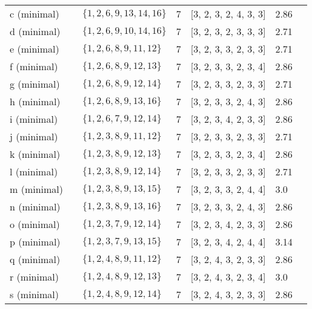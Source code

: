 \documentclass{article}%
\begin{document}
\begin{table}[ht]
\begin{tabularx}{\textwidth}{lXXXXXX}
			c (minimal) & {\Huge\textcolor{green28}{\textbullet}} & $\{1,2,6,9,13,14,16\}$ & 7 & [3, 2, 3, 2, 4, 3, 3] & 2.86 \\
			d (minimal) & {\Huge\textcolor{green29}{\textbullet}} & $\{1,2,6,9,10,14,16\}$ & 7 & [3, 2, 3, 2, 3, 3, 3] & 2.71 \\
			e (minimal) & {\Huge\textcolor{green30}{\textbullet}} & $\{1,2,6,8,9,11,12\}$ & 7 & [3, 2, 3, 3, 2, 3, 3] & 2.71 \\
			f (minimal) & {\Huge\textcolor{green31}{\textbullet}} & $\{1,2,6,8,9,12,13\}$ & 7 & [3, 2, 3, 3, 2, 3, 4] & 2.86 \\
			g (minimal) & {\Huge\textcolor{green32}{\textbullet}} & $\{1,2,6,8,9,12,14\}$ & 7 & [3, 2, 3, 3, 2, 3, 3] & 2.71 \\
			h (minimal) & {\Huge\textcolor{green33}{\textbullet}} & $\{1,2,6,8,9,13,16\}$ & 7 & [3, 2, 3, 3, 2, 4, 3] & 2.86 \\
			i (minimal) & {\Huge\textcolor{green34}{\textbullet}} & $\{1,2,6,7,9,12,14\}$ & 7 & [3, 2, 3, 4, 2, 3, 3] & 2.86 \\
			j (minimal) & {\Huge\textcolor{green35}{\textbullet}} & $\{1,2,3,8,9,11,12\}$ & 7 & [3, 2, 3, 3, 2, 3, 3] & 2.71 \\
			k (minimal) & {\Huge\textcolor{green36}{\textbullet}} & $\{1,2,3,8,9,12,13\}$ & 7 & [3, 2, 3, 3, 2, 3, 4] & 2.86 \\
			l (minimal) & {\Huge\textcolor{green37}{\textbullet}} & $\{1,2,3,8,9,12,14\}$ & 7 & [3, 2, 3, 3, 2, 3, 3] & 2.71 \\
			m (minimal) & {\Huge\textcolor{green38}{\textbullet}} & $\{1,2,3,8,9,13,15\}$ & 7 & [3, 2, 3, 3, 2, 4, 4] & 3.0 \\
			n (minimal) & {\Huge\textcolor{green39}{\textbullet}} & $\{1,2,3,8,9,13,16\}$ & 7 & [3, 2, 3, 3, 2, 4, 3] & 2.86 \\
			o (minimal) & {\Huge\textcolor{green40}{\textbullet}} & $\{1,2,3,7,9,12,14\}$ & 7 & [3, 2, 3, 4, 2, 3, 3] & 2.86 \\
			p (minimal) & {\Huge\textcolor{green41}{\textbullet}} & $\{1,2,3,7,9,13,15\}$ & 7 & [3, 2, 3, 4, 2, 4, 4] & 3.14 \\
			q (minimal) & {\Huge\textcolor{green42}{\textbullet}} & $\{1,2,4,8,9,11,12\}$ & 7 & [3, 2, 4, 3, 2, 3, 3] & 2.86 \\
			r (minimal) & {\Huge\textcolor{green43}{\textbullet}} & $\{1,2,4,8,9,12,13\}$ & 7 & [3, 2, 4, 3, 2, 3, 4] & 3.0 \\
			s (minimal) & {\Huge\textcolor{green44}{\textbullet}} & $\{1,2,4,8,9,12,14\}$ & 7 & [3, 2, 4, 3, 2, 3, 3] & 2.86 \\

\end{tabularx}
\end{table}
\end{document}
